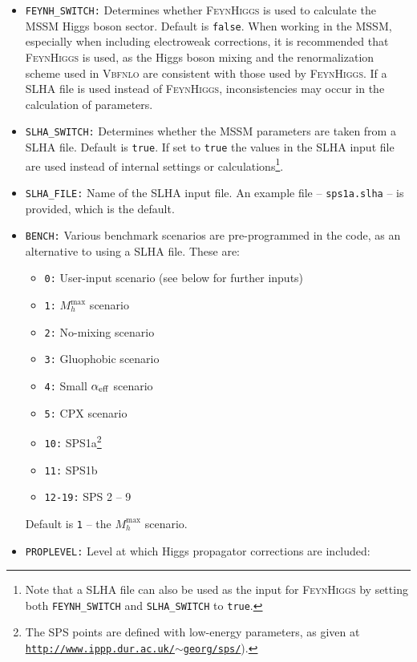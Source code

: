 \documentclass[english,12pt]{article}
\begin{document}
\begin{itemize}
 \item {\tt FEYNH\_SWITCH:} Determines whether \textsc{FeynHiggs} is used to
calculate the MSSM Higgs boson sector.  Default is {\tt false}.  When working in the
MSSM, especially when including electroweak corrections, it is recommended that
\textsc{FeynHiggs} is used, as the Higgs boson mixing and the renormalization scheme used
in \textsc{Vbfnlo} are consistent with those used by \textsc{FeynHiggs}.  If a
SLHA file is used instead of \textsc{FeynHiggs}, inconsistencies may occur in
the calculation of parameters.
 \item {\tt SLHA\_SWITCH:} Determines whether the MSSM parameters are taken from
a SLHA file.  Default is {\tt true}.  If set to {\tt true} the values in the
SLHA input file are used instead of internal settings or calculations\footnote{Note that a SLHA file can also be used as the input for \textsc{FeynHiggs} by setting both {\tt FEYNH\_SWITCH} and {\tt SLHA\_SWITCH} to {\tt true}.}.
 \item {\tt SLHA\_FILE:} Name of the SLHA input file.  An example file --
{\tt sps1a.slha} -- is provided, which is the default.
 \item {\tt BENCH:}  Various benchmark scenarios are pre-programmed in the code,
as an alternative to using a SLHA file.  These are:
   \begin{itemize}
    \item {\tt 0:} User-input scenario  (see below for further inputs)
    \item {\tt 1:} $M_{h}^{\max}$ scenario ~\cite{Carena:2002qg}
    \item {\tt 2:} No-mixing scenario ~\cite{Carena:2002qg}
    \item {\tt 3:} Gluophobic scenario ~\cite{Carena:2002qg}
    \item {\tt 4:} Small $\alpha_{\rm eff}$ scenario ~\cite{Carena:2002qg}
    \item {\tt 5:} CPX scenario ~\cite{Schael:2006cr}
    \item {\tt 10:} SPS1a\footnote{The SPS points are defined with low-energy
parameters, as given at {\tt \href{http://www.ippp.dur.ac.uk/~georg/sps/}{http://www.ippp.dur.ac.uk/$\sim$georg/sps/}}).}
~\cite{Allanach:2002nj}
    \item {\tt 11:} SPS1b
    \item {\tt 12-19:} SPS 2 -- 9
   \end{itemize}
  Default is {\tt 1} -- the $M_{h}^{\max}$ scenario. 
 \item {\tt PROPLEVEL:}  Level at which Higgs propagator corrections are included:

\end{itemize}
\end{document}
